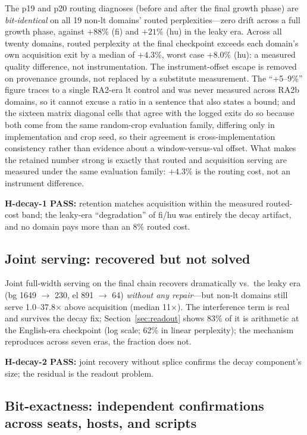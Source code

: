 \documentclass[11pt]{article}
\theoremstyle{definition}\newtheorem{definition}{Definition}
\theoremstyle{remark}\newtheorem{remark}{Remark}
\begin{document}
The p19 and p20 routing diagnoses (before and after the final growth phase) are
\emph{bit-identical} on all 19 non-lt domains' routed perplexities---zero drift across a
full growth phase, against $+88\%$ (fi) and $+21\%$ (hu) in the leaky era. Across all
twenty domains, routed perplexity at the final checkpoint exceeds each domain's own
acquisition exit by a median of $+4.3\%$, worst case $+8.0\%$ (hu): a measured quality
difference, not instrumentation. The instrument-offset escape is removed on provenance
grounds, not replaced by a substitute measurement. The ``+5--9\%'' figure traces to a
single RA2-era lt control and was never measured across RA2b domains, so it cannot excuse
a ratio in a sentence that also states a bound; and the sixteen matrix diagonal cells that
agree with the logged exits do so because both come from the same random-crop evaluation
family, differing only in implementation and crop seed, so their agreement is
cross-implementation consistency rather than evidence about a window-versus-val offset.
What makes the retained number strong is exactly that routed and acquisition serving are
measured under the same evaluation family: $+4.3\%$ is the routing cost, not an instrument
difference.

\textbf{H-decay-1 PASS:} retention matches acquisition within the measured routed-cost
band; the leaky-era ``degradation'' of fi/hu was entirely the decay artifact, and no
domain pays more than an $8\%$ routed cost.

\subsection{Joint serving: recovered but not solved}

Joint full-width serving on the final chain recovers dramatically vs.\ the leaky era
(bg 1649 $\to$ 230, el 891 $\to$ 64) \emph{without any repair}---but non-lt domains still
serve 1.0--37.8$\times$ above acquisition (median 11$\times$). The interference term is real and survives the
decay fix; Section~\ref{sec:readout} shows 83\% of it is arithmetic at the English-era checkpoint (log scale; 62\% in linear perplexity); the mechanism reproduces across seven eras, the fraction does not.

\textbf{H-decay-2 PASS:} joint recovery without splice confirms the decay component's
size; the residual is the readout problem.

\subsection{Bit-exactness: independent confirmations across seats, hosts, and scripts}
\end{document}
